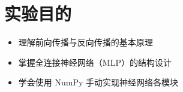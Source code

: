 \section{实验目的}  %

\begin{itemize}
\item 理解前向传播与反向传播的基本原理
\item 掌握全连接神经网络（MLP）的结构设计
\item 学会使用 NumPy 手动实现神经网络各模块
\end{itemize}